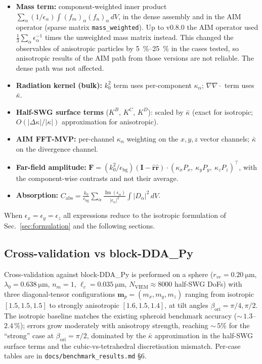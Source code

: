 \documentclass[11pt,a4paper]{article}
\begin{document}
\begin{itemize}
\item \textbf{Mass term:} component-weighted inner product
  $\sum_\alpha (1/\epsilon_\alpha)\int (f_m)_\alpha(f_n)_\alpha\,dV$,
  in the dense assembly and in the AIM operator (sparse matrix
  \texttt{mass\_weighted}). Up to v0.8.0 the AIM operator used
  $\tfrac{1}{3}\sum_\alpha \epsilon_\alpha^{-1}$ times the unweighted
  mass matrix instead. This changed the observables of anisotropic
  particles by \SIrange{5}{25}{\percent} in the cases tested, so
  anisotropic results of the AIM path from those versions are not
  reliable. The dense path was not affected.
\item \textbf{Radiation kernel (bulk):} $k_0^2$ term uses per-component
  $\kappa_\alpha$; $\nabla\nabla\!\cdot$ term uses $\bar{\kappa}$.
\item \textbf{Half-SWG surface terms} ($K^B$, $K^C$, $K^D$): scaled by
  $\bar{\kappa}$ (exact for isotropic; $O(|\Delta\kappa|/|\kappa|)$
  approximation for anisotropic).
\item \textbf{AIM FFT-MVP:} per-channel $\kappa_\alpha$ weighting on
  the $x,y,z$ vector channels; $\bar{\kappa}$ on the divergence channel.
\item \textbf{Far-field amplitude:}
  $\bm{F} = (k_0^2/\epsilon_{\text{bg}})
  (\mathbf{I} - \hat{\bm{r}}\hat{\bm{r}})\cdot
  (\kappa_x P_x,\ \kappa_y P_y,\ \kappa_z P_z)^{\top}$,
  with the component-wise contrasts and not their average.
\item \textbf{Absorption:}
  $C_{\text{abs}} = \frac{k_0}{\epsilon_{\text{bg}}}
  \sum_\alpha \frac{\operatorname{Im}(\epsilon_\alpha)}{|\epsilon_\alpha|^2}
  \int |D_\alpha|^2\,dV$.
\end{itemize}
When $\epsilon_x = \epsilon_y = \epsilon_z$ all expressions reduce to the
isotropic formulation of Sec.~\ref{sec:formulation} and the following
sections.

\subsection{Cross-validation vs block-DDA\_Py}
\label{sec:aniso-crossval}

Cross-validation against block-DDA\_Py is performed on a sphere
($r_{ve} = \SI{0.20}{\micro\meter}$,
$\lambda_0 = \SI{0.638}{\micro\meter}$, $n_m = 1$,
$\ell_c = \SI{0.035}{\micro\meter}$, $N_{\text{VIEM}} \approx 8000$
half-SWG DoFs) with three diagonal-tensor configurations
$\bm m_p = (m_x, m_y, m_z)$ ranging from isotropic
$[1.5,1.5,1.5]$ to strongly anisotropic $[1.6,1.5,1.4]$, at tilt
angles $\beta_{\text{ori}} = \pi/4, \pi/2$.  The isotropic baseline
matches the existing spheroid benchmark accuracy
(${\sim}\,1.3$--$2.4\,\%$); errors grow moderately with anisotropy
strength, reaching ${\sim}\,5\%$ for the ``strong'' case at
$\beta_{\text{ori}} = \pi/2$, dominated by the $\bar{\kappa}$
approximation in the half-SWG surface terms and the
cubic-vs-tetrahedral discretisation mismatch.  Per-case tables are
in \texttt{docs/benchmark\_results.md} \S 6.
\end{document}
